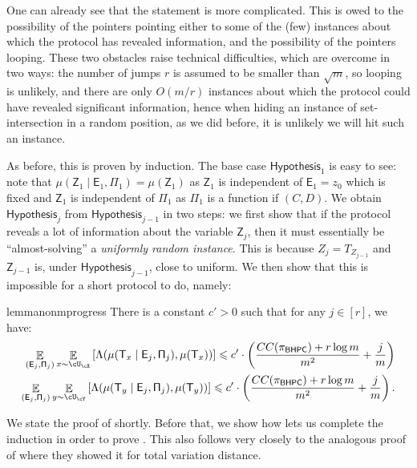 \documentclass[11pt,letterpaper]{article}
\DeclareMathOperator*{\E}{\mathbb{E}}
\renewcommand{\leq}{\leqslant}
\theoremstyle{definition}
\newcommand{\rPi}{\rv{\Pi}}
\newcommand{\bhpc}{\ensuremath{\textnormal{\textsf{BHPC}}}\xspace}
\newcommand{\rv}[1]{\ensuremath{\mathsf{#1}}}
\newcommand{\rZ}{\rv{Z}}
\newcommand{\rT}{\rv{T}}
\newcommand{\rE}{\rv{E}}
\begin{document}
One can already see that the statement is more complicated. This is owed to the possibility of the pointers pointing either to some of the (few) instances about which the protocol has revealed information, and the possibility of the pointers looping. These two obstacles raise technical difficulties, which are overcome in two ways: the number of jumps $r$ is assumed to be smaller than $\sqrt m$, so looping is unlikely, and there are only $O(m/r)$ instances about which the protocol could have revealed significant information, hence when hiding an instance of set-intersection in a random position, as we did before, it is unlikely we will hit such an instance.

As before, this is proven by induction. The base case $\mathsf{Hypothesis}_1$ is easy to see: note that $\mu(\rZ_1 \mid \rE_1, \rPi_1) = \mu(\rZ_1)$ as $\rZ_1$ is independent of $\rE_1 = z_0$ which is fixed and $\rZ_1$ is independent of $\rPi_1$ as $\Pi_1$ is a function if $(C,D)$. We obtain
$\mathsf{Hypothesis}_j$ from $\mathsf{Hypothesis}_{j-1}$ in two steps: we first show that if the protocol reveals a lot of information about the variable $\rZ_{j}$, then it must essentially be ``almost-solving'' a \textit{uniformly random instance}. This is because $Z_{j} = T_{Z_{j-1}}$ and $\rZ_{j-1}$ is, under $\mathsf{Hypothesis}_{j-1}$, close to uniform. We then show that this is impossible for a short protocol to do, namely: 

\begin{restatable}%
{lemma}{nonmprogress} \label{lem:nonmprogress}
There is a constant $c' > 0$ such that for any $j \in [r]$, we have:
\begin{align*}
\E_{(\rE_j, \rPi_j)}\E_{x \sim \cU_\cX}\left[\Lambda(\mu(\rT_x \mid \rE_j, \rPi_j), \mu(\rT_x))\right] \leq  c' \cdot \left( \frac{CC(\pi_\bhpc)+r\log m}{m^2} + \frac{j} m\right)\\
\E_{(\rE_j, \rPi_j)}\E_{y \sim \cU_\cY}\left[\Lambda(\mu(\rT_y \mid \rE_j, \rPi_j), \mu(\rT_y))\right] \leq c' \cdot \left( \frac{CC(\pi_\bhpc)+r\log m}{m^2} + \frac{j} m\right).
\end{align*}
\end{restatable}

We state the proof of  shortly. Before that, we show how  lets us complete the induction in order to prove . This also follows very closely to the analogous proof of \cite{AssadiCK19} where they showed it for total variation distance.
\end{document}
